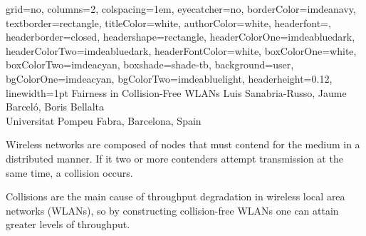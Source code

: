 \documentclass[portrait,a0paper]{baposter}
\begin{document}
\begin{poster}
{
	grid=no,
	columns=2,
	colspacing=1em,
	eyecatcher=no,
	borderColor=imdeanavy,
	textborder=rectangle,
  	titleColor=white,
    	authorColor=white,
	headerfont=\textsf,
	headerborder=closed,
	headershape=rectangle,
	headerColorOne=imdeabluedark,
	headerColorTwo=imdeabluedark,
	headerFontColor=white,
	boxColorOne=white,
	boxColorTwo=imdeacyan,
	boxshade=shade-tb,
	background=user,
	bgColorOne=imdeacyan,
	bgColorTwo=imdeabluelight,
	headerheight=0.12\textheight,
	linewidth=1pt
}
{
}
{Fairness in Collision-Free WLANs}
{
	Luis Sanabria-Russo, Jaume Barcel{\'o}, Boris Bellalta\vspace{0.5em}\\
	\normalsize Universitat Pompeu Fabra, Barcelona, Spain
}

{

Wireless networks are composed of nodes that must contend for the medium in a distributed manner. If it two or more contenders attempt transmission at the same time, a collision occurs. %

Collisions are the main cause of throughput degradation in wireless local area networks (WLANs), so by constructing collision-free WLANs one can attain greater levels of throughput.


}

\end{poster}
\end{document}
